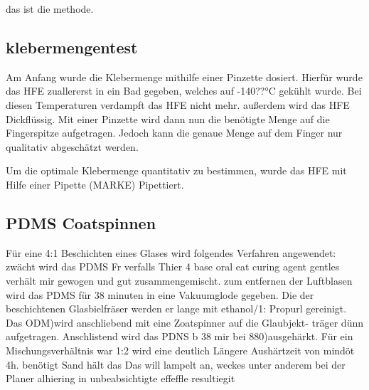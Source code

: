 das ist die methode.

\subsection{klebermengentest}
Am Anfang wurde die Klebermenge mithilfe einer Pinzette dosiert. Hierfür wurde das HFE zuallererst in ein Bad gegeben, welches auf -140??°C gekühlt wurde. Bei diesen Temperaturen verdampft das HFE nicht mehr. außerdem wird das HFE Dickflüssig. Mit einer Pinzette wird dann nun die benötigte Menge auf die Fingerspitze aufgetragen. Jedoch kann die genaue Menge auf dem Finger nur qualitativ abgeschätzt werden.

Um die optimale Klebermenge quantitativ zu bestimmen, wurde das HFE mit Hilfe einer Pipette (MARKE) Pipettiert. 

\subsection{PDMS Coatspinnen}

Für eine 4:1 Beschichten eines Glases wird folgendes
Verfahren angewendet: zwächt wird das PDMS Fr
verfalls Thier 4 base oral eat curing agent gentles
verhält mir gewogen und gut zusammengemischt.
zum entfernen der Luftblasen wird das PDMS für
38 minuten in eine Vakuumglode gegeben. Die
der beschichtenen Glasbielfräser werden er lange mit
ethanol/1: Propurl gereinigt. Das ODM)wird
anschliebend mit eine Zoatspinner auf die Glaubjekt-
träger dünn aufgetragen. Anschlistend wird das PDNS
b 38 mir bei 880)ausgehärkt.
Für ein Mischungsverhältnis war 1:2 wird eine deutlich
Längere Aushärtzeit von mindöt 4h. benötigt Sand hält das
Das will lampelt an, weckes unter anderem bei der Planer
alhiering in unbeabsichtigte effeffle resultiegit 